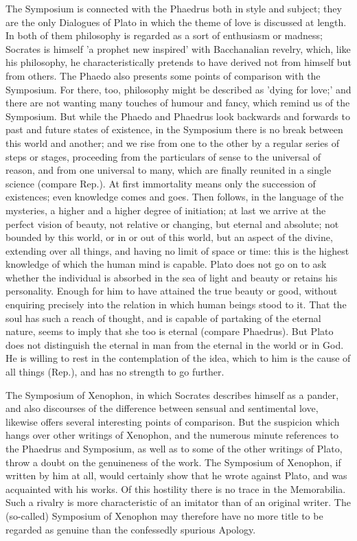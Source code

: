 \documentclass[11pt,letter]{article}
\begin{document}
\par  The Symposium is connected with the Phaedrus both in style and subject; they are the only Dialogues of Plato in which the theme of love is discussed at length. In both of them philosophy is regarded as a sort of enthusiasm or madness; Socrates is himself 'a prophet new inspired' with Bacchanalian revelry, which, like his philosophy, he characteristically pretends to have derived not from himself but from others. The Phaedo also presents some points of comparison with the Symposium. For there, too, philosophy might be described as 'dying for love;' and there are not wanting many touches of humour and fancy, which remind us of the Symposium. But while the Phaedo and Phaedrus look backwards and forwards to past and future states of existence, in the Symposium there is no break between this world and another; and we rise from one to the other by a regular series of steps or stages, proceeding from the particulars of sense to the universal of reason, and from one universal to many, which are finally reunited in a single science (compare Rep.). At first immortality means only the succession of existences; even knowledge comes and goes. Then follows, in the language of the mysteries, a higher and a higher degree of initiation; at last we arrive at the perfect vision of beauty, not relative or changing, but eternal and absolute; not bounded by this world, or in or out of this world, but an aspect of the divine, extending over all things, and having no limit of space or time: this is the highest knowledge of which the human mind is capable. Plato does not go on to ask whether the individual is absorbed in the sea of light and beauty or retains his personality. Enough for him to have attained the true beauty or good, without enquiring precisely into the relation in which human beings stood to it. That the soul has such a reach of thought, and is capable of partaking of the eternal nature, seems to imply that she too is eternal (compare Phaedrus). But Plato does not distinguish the eternal in man from the eternal in the world or in God. He is willing to rest in the contemplation of the idea, which to him is the cause of all things (Rep.), and has no strength to go further.

\par  The Symposium of Xenophon, in which Socrates describes himself as a pander, and also discourses of the difference between sensual and sentimental love, likewise offers several interesting points of comparison. But the suspicion which hangs over other writings of Xenophon, and the numerous minute references to the Phaedrus and Symposium, as well as to some of the other writings of Plato, throw a doubt on the genuineness of the work. The Symposium of Xenophon, if written by him at all, would certainly show that he wrote against Plato, and was acquainted with his works. Of this hostility there is no trace in the Memorabilia. Such a rivalry is more characteristic of an imitator than of an original writer. The (so-called) Symposium of Xenophon may therefore have no more title to be regarded as genuine than the confessedly spurious Apology.
\end{document}
